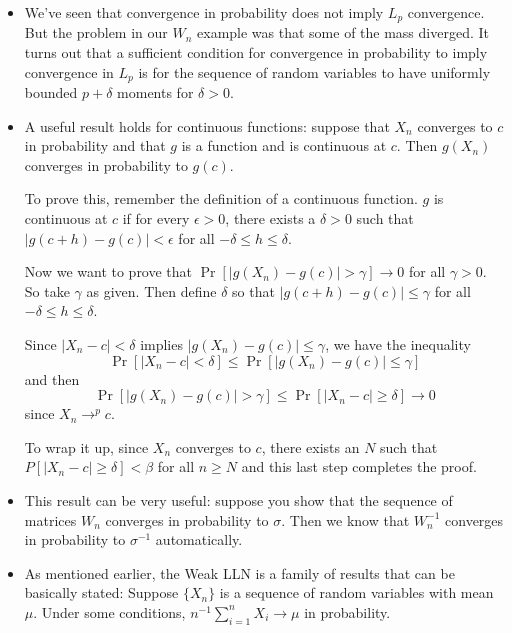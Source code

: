\begin{itemize}[leftmargin=0pt]
\item We've seen that convergence in probability does not imply $L_p$
  convergence.  But the problem in our $W_n$ example was that some of
  the mass diverged.  It turns out that a sufficient condition for
  convergence in probability to imply convergence in $L_p$ is for the
  sequence of random variables to have uniformly bounded $p + \delta$
  moments for $\delta > 0$.

\item A useful result holds for continuous functions: suppose that
  $X_n$ converges to $c$ in probability and that $g$ is a function and
  is continuous at $c$.  Then $g(X_n)$ converges in probability to
  $g(c)$.

  To prove this, remember the definition of a continuous function.
  $g$ is continuous at $c$ if for every $\epsilon >0$, there exists a $\delta > 0$
  such that $|g(c + h) - g(c)| < \epsilon$ for all $-\delta \leq h \leq \delta$.

  Now we want to prove that $\Pr[|g(X_n) - g(c)| > \gamma] \to 0$ for all $\gamma
  > 0$.  So take $\gamma$ as given.  Then define $\delta$ so that $|g(c + h) -
  g(c)| \leq \gamma$ for all $-\delta \leq h \leq \delta$.

  Since $|X_n - c| < \delta$ implies $|g(X_n) - g(c)| \leq \gamma$, we have the
  inequality
  \begin{equation*}
    \Pr[ |X_n - c| < \delta] \leq \Pr[ |g(X_n) - g(c)| \leq \gamma ]
  \end{equation*}
  and then
  \begin{equation*}
    \Pr[|g(X_n) - g(c)| > \gamma] \leq \Pr[|X_n - c| \geq \delta] \to 0
  \end{equation*}
  since $X_n \to^p c$.

  To wrap it up, since $X_n$ converges to $c$, there exists an $N$
  such that $P[|X_n - c| \geq \delta] < \beta$ for all $n \geq N$ and this last step
  completes the proof.

\item This result can be very useful: suppose you show that the
  sequence of matrices $W_n$ converges in probability to $\sigma$.  Then we
  know that $W_n^{-1}$ converges in probability to $\sigma^{-1}$ automatically.


\item As mentioned earlier, the Weak LLN is a family of results that
  can be basically stated: Suppose $\{X_n\}$ is a sequence of random
  variables with mean $\mu$.  Under some conditions, $n^{-1} \sum_{i=1}^n
  X_i \to \mu$ in probability.


\end{itemize}
